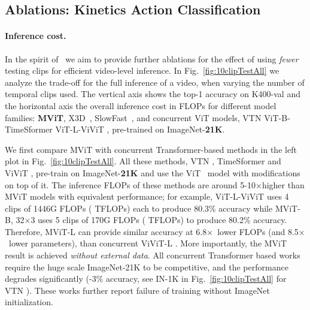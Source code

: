 \documentclass[10pt,twocolumn,letterpaper]{article}
\newcommand{\figref}[1]{Fig.~\ref{#1}}
\def\x{$\times$}
\begin{document}
\subsection{Ablations: Kinetics Action Classification}\label{sec:ablations_kinetics}



\paragraph{Inference cost.}

In the spirit of~\cite{feichtenhofer2020x3d} we aim to provide further ablations for the effect of using \textit{fewer }testing clips for efficient video-level inference. In \figref{fig:10clipTestAll} we analyze the trade-off for the full inference of a video, when varying the number of temporal clips used. The vertical axis shows the top-1 accuracy on K400-{val}  and the horizontal axis the overall inference cost in FLOPs for different  model families: \textbf{MViT}, X3D~\cite{feichtenhofer2020x3d}, SlowFast~\cite{Feichtenhofer2019}, and concurrent ViT models, VTN \cite{neimark2021video} ViT-B-TimeSformer \cite{bertasius2021space} ViT-L-ViViT \cite{arnab2021vivit}, pre-trained on ImageNet-\textbf{21K}. 

We first compare MViT with concurrent Transformer-based methods in the left plot in \figref{fig:10clipTestAll}. All these methods, VTN \cite{neimark2021video},  TimeSformer \cite{bertasius2021space} and ViViT \cite{arnab2021vivit}, pre-train on ImageNet-\textbf{21K} and use the ViT~\cite{dosovitskiy2020image} model with modifications on top of it. The inference FLOPs of these methods are around 5-10\x higher than MViT models with equivalent performance; for example, ViT-L-ViViT \cite{arnab2021vivit} uses 4 clips of 1446G FLOPs ( TFLOPs) each to produce 80.3\% accuracy while MViT-B, 32\x3 uses 5 clips of 170G FLOPs ( TFLOPs) to produce 80.2\% accuracy. Therefore, MViT-L can provide similar accuracy at 6.8\x~lower  FLOPs (and 8.5\x~lower parameters), than concurrent ViViT-L \cite{arnab2021vivit}. More importantly, the MViT result is achieved \textit{without external data}. All concurrent Transformer based works~\cite{neimark2021video,bertasius2021space,arnab2021vivit} require the huge scale ImageNet-21K to be competitive, and the performance degrades significantly (-3\% accuracy, see IN-1K in \figref{fig:10clipTestAll} for VTN \cite{neimark2021video}). These works further report failure of training without ImageNet initialization. 
\end{document}
